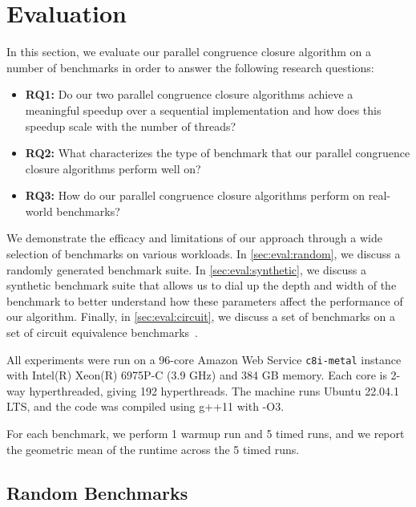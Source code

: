 \section{Evaluation}
\label{sec:eval}

In this section, we evaluate our parallel congruence closure algorithm on a
number of benchmarks in order to answer the following research questions:

\begin{itemize}
  \item \textbf{RQ1:} Do our two parallel congruence closure algorithms achieve
  a meaningful speedup over a sequential implementation and how does this
  speedup scale with the number of threads?
  \item \textbf{RQ2:} What characterizes the type of benchmark that our parallel
  congruence closure algorithms perform well on?
  \item \textbf{RQ3:} How do our parallel congruence closure algorithms perform
  on real-world benchmarks?
\end{itemize}

We demonstrate the efficacy and limitations of our approach through a wide
selection of benchmarks on various workloads. In \autoref{sec:eval:random}, we
discuss a randomly generated benchmark suite. In \autoref{sec:eval:synthetic},
we discuss a synthetic benchmark suite that allows us to dial up the depth and
width of the benchmark to better understand how these parameters affect the
performance of our algorithm. Finally, in \autoref{sec:eval:circuit}, we discuss
a set of benchmarks on a set of circuit equivalence
benchmarks~\cite{clausal-cc}.

All experiments were run on a 96-core Amazon Web Service \texttt{c8i-metal}
instance with Intel(R) Xeon(R) 6975P-C (3.9 GHz) and 384 GB memory. Each core is
2-way hyperthreaded, giving 192 hyperthreads. The machine runs Ubuntu 22.04.1
LTS, and the code was compiled using g++11 with -O3.

For each benchmark, we perform 1 warmup run and 5 timed runs, and we report the
geometric mean of the runtime across the 5 timed runs.


\subsection{Random Benchmarks}~\label{sec:eval:random}

